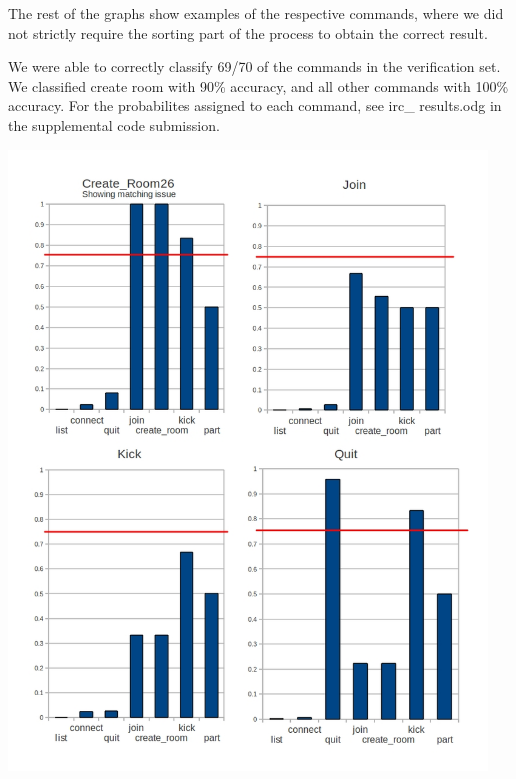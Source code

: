 \documentclass[11pt, oneside]{article}
\begin{document}
The rest of the graphs show examples of the respective commands, where we did 
not strictly require the sorting part of the process to obtain the correct 
result.

We were able to correctly classify 69/70 of the commands in the verification 
set. We classified create room with 90\% accuracy, and all other commands with 
100\% accuracy. For the probabilites assigned to each command, see irc\_
results.odg in the supplemental code submission.

\includegraphics[height=6.47in, width=5in]{irc1.jpg}\\
\end{document}
